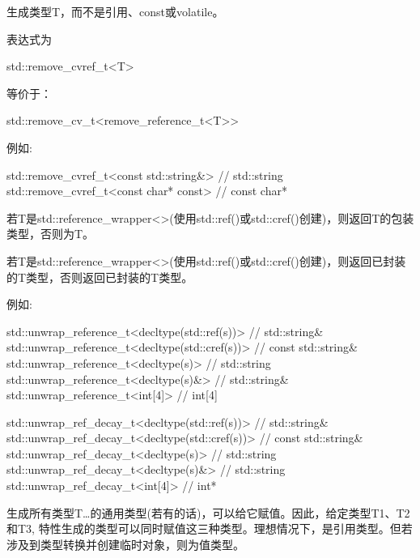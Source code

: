 



生成类型T，而不是引用、const或volatile。

表达式为

\begin{cpp}
std::remove_cvref_t<T>
\end{cpp}

等价于：

\begin{cpp}
std::remove_cv_t<remove_reference_t<T>>
\end{cpp}

例如:

\begin{cpp}
std::remove_cvref_t<const std::string&> // std::string
std::remove_cvref_t<const char* const> // const char*
\end{cpp}



若T是std::reference\_wrapper<>(使用std::ref()或std::cref()创建)，则返回T的包装类型，否则为T。


若T是std::reference\_wrapper<>(使用std::ref()或std::cref()创建)，则返回已封装的T类型，否则返回已封装的T类型。

例如:

\begin{cpp}
std::unwrap_reference_t<decltype(std::ref(s))> // std::string&
std::unwrap_reference_t<decltype(std::cref(s))> // const std::string&
std::unwrap_reference_t<decltype(s)> // std::string
std::unwrap_reference_t<decltype(s)&> // std::string&
std::unwrap_reference_t<int[4]> // int[4]

std::unwrap_ref_decay_t<decltype(std::ref(s))> // std::string&
std::unwrap_ref_decay_t<decltype(std::cref(s))> // const std::string&
std::unwrap_ref_decay_t<decltype(s)> // std::string
std::unwrap_ref_decay_t<decltype(s)&> // std::string
std::unwrap_ref_decay_t<int[4]> // int*
\end{cpp}




生成所有类型T…的通用类型(若有的话)，可以给它赋值。因此，给定类型T1、T2和T3, 特性生成的类型可以同时赋值这三种类型。理想情况下，是引用类型。但若涉及到类型转换并创建临时对象，则为值类型。

